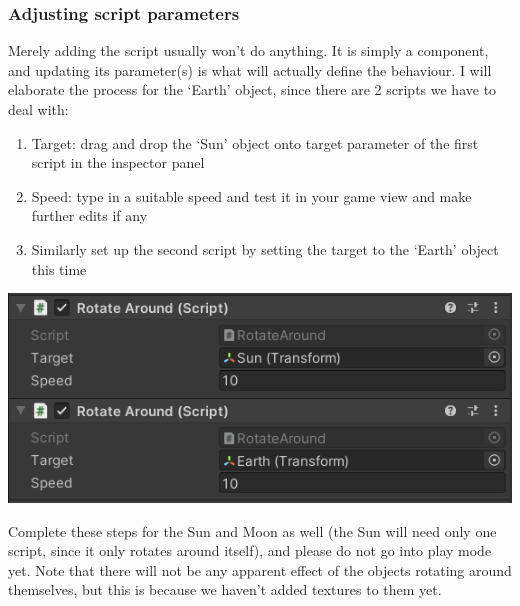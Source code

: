 \documentclass{article}[a4paper,12pt]
\theoremstyle{definition}
\begin{document}
\subsubsection{Adjusting script parameters}
Merely adding the script usually won't do anything. It is simply a component, and updating its parameter(s) is what will actually define the behaviour. I will elaborate the process for the `Earth' object, since there are 2 scripts we have to deal with:
\begin{enumerate}
	\item Target: drag and drop the `Sun' object onto target parameter of the first script in the inspector panel
	\item Speed: type in a suitable speed and test it in your game view and make further edits if any
	\item Similarly set up the second script by setting the target to the `Earth' object this time
\end{enumerate}
\begin{center}\includegraphics{rotatearound_earth.png}\end{center}
Complete these steps for the Sun and Moon as well (the Sun will need only one script, since it only rotates around itself), and please do not go into play mode yet. Note that there will not be any apparent effect of the objects rotating around themselves, but this is because we haven't added textures to them yet.
\end{document}
